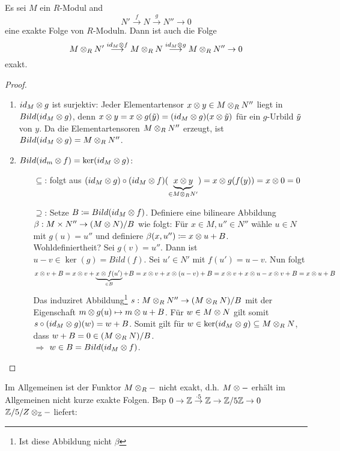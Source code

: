 \documentclass[../main.tex]{subfiles}
\begin{document}
\begin{theorem}
    Es sei $M$ ein $R$-Modul and $$N'\overset{f}{\longrightarrow} N \overset{g}{\longrightarrow} N'' \rightarrow 0$$ eine exakte Folge von $R$-Moduln.
    Dann ist auch die Folge $$M\otimes_R N'\overset{id_M\otimes f}{\longrightarrow} M\otimes_R N \overset{id_M\otimes g}{\longrightarrow} M\otimes_R N'' \rightarrow 0$$ exakt.
\end{theorem}
\begin{proof} $ $
    \begin{enumerate}
        \item $id_M\otimes g$ ist surjektiv:
        Jeder Elementartensor $x\otimes y\in M\otimes_R N''$ liegt in $Bild(id_M\otimes g)$, denn $x\otimes y = x\otimes g(\Tilde{y}) = (id_M\otimes g) (x\otimes \Tilde{y})$ für ein $g$-Urbild $\Tilde{y}$ von $y$.
        Da die Elementartensoren $M\otimes_R N''$ erzeugt, ist $Bild(id_M \otimes g) = M\otimes_R N''$.
        \item $Bild(id_m\otimes f) =\ker(id_M \otimes g)$:
        \begin{itemize}
            \item[$\subseteq$:] 
            folgt aus $(id_M\otimes g)\circ (id_M\otimes f) (\underbrace{x\otimes y}_{\in M\otimes_R N'}) = x\otimes g(f(y)) = x\otimes 0 = 0$\item[$\supseteq$:]
            Setze $B\coloneqq Bild(id_M\otimes f)$.
        Definiere eine bilineare Abbildung $\beta: M\times N'' \rightarrow (M\otimes N)/B$ wie folgt:
        Für $x\in M, u'' \in N''$ wähle $u\in N$ mit $g(u) = u''$ und definiere $\beta(x,u'')\coloneqq x\otimes u + B$.\\
        Wohldefiniertheit? Sei $g(v) = u''$. Dann ist $u-v \in \ker(g) = Bild(f)$. Sei $u'\in N'$ mit $f(u') = u-v$. Nun folgt $$x\otimes v +B = x\otimes v + \underbrace{x\otimes f(u')}_{\in B} +B = x\otimes v + x\otimes (u-v) +B = x\otimes v + x\otimes u - x\otimes v + B = x\otimes u +B$$
        Das induziret Abbildung\footnote{Ist diese Abbildung nicht $\beta$} $s:M\otimes_R N'' \rightarrow (M\otimes_R N)/B$ mit der Eigenschaft $m\otimes g(u)\mapsto m\otimes u +B$.
        Für $w\in M\otimes N$ gilt somit $s\circ(id_M\otimes g)(w) = w+B$.
        Somit gilt für $w\in \ker(id_M\otimes g)\subseteq M\otimes_R N$, dass $w+B=0\in (M\otimes_R N)/B$.\\
        $\Longrightarrow$ $w\in B = Bild(id_M\otimes f)$.
        \end{itemize}
    \end{enumerate}
\end{proof}
\begin{remark}
    Im Allgemeinen ist der Funktor $M\otimes_R -$ nicht exakt, d.h. $M\otimes -$ erhält im Allgemeinen nicht kurze exakte Folgen.
    Bsp $0\rightarrow\mathbb{Z}\overset{\cdot 5}{\rightarrow} \mathbb{Z}\rightarrow\mathbb{Z}/5\mathbb{Z}\rightarrow 0$
    $\mathbb{Z}/5/Z\otimes_{\mathbb{Z}} -$ liefert:
    \TODO[bild]
\end{remark}
\end{document}
